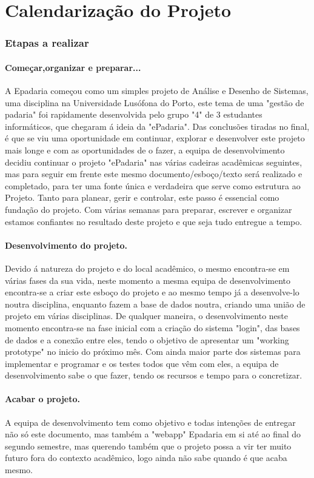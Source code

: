 \chapter{Calendarização do Projeto}
\label{calendarizacao}
\subsection{Etapas a realizar}
\subsubsection{	Começar,organizar e preparar...}
A Epadaria começou como um simples projeto de Análise e Desenho de Sistemas, uma disciplina na Universidade Lusófona do Porto, este tema de uma "gestão de padaria" foi rapidamente desenvolvida pelo grupo "4" de 3 estudantes informáticos, que chegaram á ideia da "ePadaria". Das conclusões tiradas no final, é que se viu uma oportunidade em continuar, explorar e desenvolver este projeto mais longe e com as oportunidades de o fazer, a equipa de desenvolvimento decidiu continuar o projeto "ePadaria" nas várias cadeiras acadêmicas seguintes, mas para seguir em frente este mesmo documento/esboço/texto será realizado e completado, para ter uma fonte única e verdadeira que serve como estrutura ao Projeto. Tanto para planear, gerir e controlar, este passo é essencial como fundação do projeto. Com várias semanas para preparar, escrever e organizar estamos confiantes no resultado deste projeto e que seja tudo entregue a tempo.
\subsubsection{Desenvolvimento do projeto.}
Devido á natureza do projeto e do local acadêmico, o mesmo encontra-se em várias fases da sua vida, neste momento a mesma equipa de desenvolvimento encontra-se a criar este esboço do projeto e ao mesmo tempo já a desenvolve-lo noutra disciplina, enquanto fazem a base de dados noutra, criando uma união de projeto em várias disciplinas. De qualquer maneira, o desenvolvimento neste momento encontra-se na fase inicial com a criação do sistema "login", das bases de dados e a conexão entre eles, tendo o objetivo de apresentar um "working prototype" no inicio do próximo mês. Com ainda maior parte dos sistemas para implementar e programar e os testes todos que vêm com eles, a equipa de desenvolvimento sabe o que fazer, tendo os recursos e tempo para o concretizar.
\subsubsection{Acabar o projeto.}
A equipa de desenvolvimento tem como objetivo e todas intenções de entregar não só este documento, mas também a "webapp" Epadaria em si até ao final do segundo semestre, mas querendo também que o projeto possa a vir ter muito futuro fora do contexto acadêmico, logo ainda não sabe quando é que acaba mesmo.
